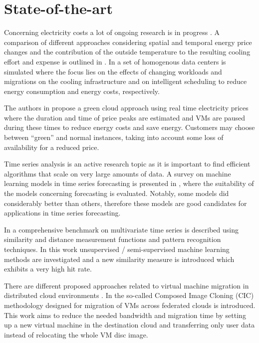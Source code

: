 \documentclass[a4paper]{article}
\begin{document}
\section{State-of-the-art}

Concerning electricity costs a lot of ongoing research is in progress \cite{guler2013cutting, le2011reducing}. A comparison of different approaches considering spatial and temporal energy price changes and the contribution of the outside temperature to the resulting cooling effort and expense is outlined in \cite{guler2013cutting}. In \cite{le2011reducing} a set of homogenous data centers is simulated where the focus lies on the effects of changing workloads and migrations on the cooling infrastructure and on intelligent scheduling to reduce energy consumption and energy costs, respectively. 


The authors in \cite{lucanin2013take} propose a green cloud approach using real time electricity prices where the duration and time of price peaks are estimated and VMs are paused during these times to reduce energy costs and save energy. Customers may choose between ``green'' and normal instances, taking into account some loss of availability for a reduced price. 

Time series analysis is an active research topic as it is important to find efficient algorithms that scale on very large amounts of data. A survey on machine learning models in time series forecasting is presented in \cite{ahmed2010empirical}, where the suitability of the models concerning forecasting is evaluated. Notably, some models did considerably better than others, therefore these models are good candidates for applications in time series forecasting. 

In \cite{lin2011pattern} a comprehensive benchmark on multivariate time series is described using similarity and distance measurement functions and pattern recognition techniques. In this work unsupervised / semi-supervised machine learning methods are investigated and a new similarity measure is introduced which exhibits a very high hit rate. 

There are different proposed approaches related to virtual machine migration in distributed cloud environments \cite{celesti2010improving, malet2010resource}. In \cite{celesti2010improving} the so-called Composed Image Cloning (CIC) methodology designed for migration of VMs across federated clouds is introduced. This work aims to reduce the needed bandwidth and migration time by setting up a new virtual machine in the destination cloud and transferring only user data instead of relocating the whole VM disc image. 
\end{document}

